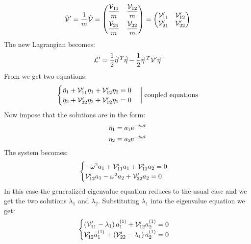 \begin{equation}
    \hat{\mathcal{V}}' = \dfrac{1}{m}\hat{\mathcal{V}} = \begin{pmatrix}
        \dfrac{\mathcal{V}_{11}}{m} & \dfrac{\mathcal{V}_{12}}{m}\\[8pt]
        \dfrac{\mathcal{V}_{21}}{m} & \dfrac{\mathcal{V}_{22}}{m}
    \end{pmatrix} = \begin{pmatrix}
        \mathcal{V}_{11}' & \mathcal{V}_{12}'\\
        \mathcal{V}_{21}' & \mathcal{V}_{22}'
    \end{pmatrix}
\end{equation}
The new Lagrangian becomes:
\begin{equation}
    \mathcal{L}' = \dfrac{1}{2}\dot{\vec{\eta}}^{\;T} \dot{\vec{\eta}} - \dfrac{1}{2}\vec{\eta}^{\;T} \mathcal{V}' \vec{\eta}
\end{equation}
From \eleref\;we get two equations:
\begin{equation}
    \begin{cases}
        \ddot{\eta}_1 + \mathcal{V}'_{11}\eta_1 + \mathcal{V}'_{12}\eta_2 = 0\\
        \ddot{\eta}_2 + \mathcal{V}'_{22}\eta_2 + \mathcal{V}'_{12}\eta_1 = 0
    \end{cases} \bigg|\;\text{coupled equations}
\end{equation}
Now impose that the solutions are in the form:
\begin{equation}
    \begin{split}
        \eta_1 = a_1\mathrm{e}^{-i\omega t} \\
        \eta_2 = a_2\mathrm{e}^{-i\omega t}
    \end{split}
\end{equation}
The system becomes:
\begin{equation}
    \begin{cases}
        -\omega^2 a_1 + \mathcal{V}'_{11}a_1 + \mathcal{V}'_{12}a_2 = 0\\
        \mathcal{V}'_{12}a_1 -\omega^2 a_2 + \mathcal{V}'_{22}a_2 = 0
    \end{cases}
\end{equation}
In this case the generalized eigenvalue equation reduces to the usual case and we get the two solutions $\lambda_1$ and $\lambda_2$. Substituting $\lambda_1$ into the eigenvalue equation we get:
\begin{equation}
    \begin{cases}
        \left(\mathcal{V}'_{11}-\lambda_1\right)a_1^{(1)} + \mathcal{V}'_{12}a_2^{(1)} = 0\\
        \mathcal{V}'_{12}a_1^{(1)} + \left(\mathcal{V}'_{22}-\lambda_1\right)a_2^{(1)} = 0
    \end{cases}
\end{equation}
